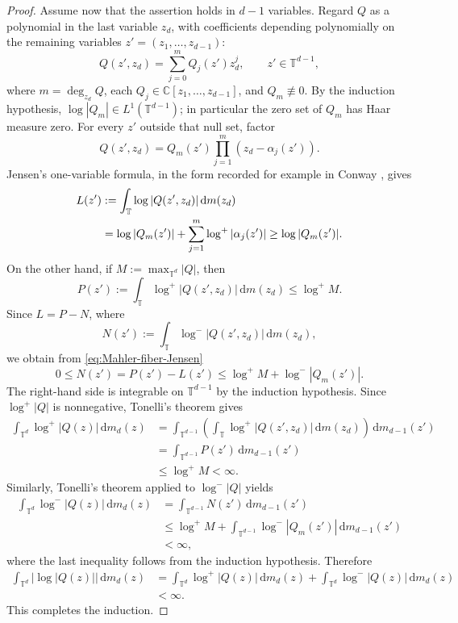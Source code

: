 \documentclass[11pt]{article}
\theoremstyle{definition}
\newcommand{\C}{\mathbb C}
\newcommand{\T}{\mathbb T}
\newcommand{\dd}{\,\mathrm d}
\newcommand{\1}{\mathbf 1}
\begin{document}
\begin{proof}
Assume now that the assertion holds in $d-1$ variables.  Regard $Q$
as a polynomial in the last variable $z_d$, with coefficients depending
polynomially on the remaining variables $z'=(z_1,\ldots,z_{d-1})$:
\[
Q(z',z_d)=\sum_{j=0}^m Q_j(z')z_d^j,
\qquad z'\in\T^{d-1},
\]
where $m=\deg_{z_d}Q$, each $Q_j\in\C[z_1,\ldots,z_{d-1}]$, and
$Q_m\not\equiv0$.  By the induction hypothesis, $\log|Q_m|\in L^1(\T^{d-1})$; in particular the zero set of $Q_m$ has Haar measure zero.  For every $z'$ outside that null set, factor
\[
Q(z',z_d)=Q_m(z')\prod_{j=1}^m(z_d-\alpha_j(z')).
\]
Jensen's one-variable formula, in the form recorded for example in Conway \cite[Chapter~XI, Section~1]{Conway1978}, gives
\begin{align}
L(z')
&:=\int_{\T}\log|Q(z',z_d)|\dd m(z_d)\notag\\
&=\log|Q_m(z')|+\sum_{j=1}^m\log^+|\alpha_j(z')|
\ge \log|Q_m(z')|.
\label{eq:Mahler-fiber-Jensen}
\end{align}
On the other hand, if $M:=\max_{\T^d}|Q|$, then
\[
P(z'):=\int_{\T}\log^+|Q(z',z_d)|\dd m(z_d)
\le \log^+M.
\]
Since $L=P-N$, where
\[
N(z'):=\int_{\T}\log^-|Q(z',z_d)|\dd m(z_d),
\]
we obtain from \eqref{eq:Mahler-fiber-Jensen}
\[
0\le N(z')
=P(z')-L(z')
\le \log^+M+\log^-|Q_m(z')|.
\]
The right-hand side is integrable on $\T^{d-1}$ by the induction
hypothesis.  Since $\log^+|Q|$ is nonnegative, Tonelli's theorem gives
\[
\begin{aligned}
\int_{\T^d}\log^+|Q(z)|\dd m_d(z)
&=
\int_{\T^{d-1}}
\left(
\int_{\T}\log^+|Q(z',z_d)|\dd m(z_d)
\right)
\dd m_{d-1}(z')\\
&=
\int_{\T^{d-1}}P(z')\dd m_{d-1}(z')\\
&\le \log^+M<\infty.
\end{aligned}
\]
Similarly, Tonelli's theorem applied to $\log^-|Q|$ yields
\[
\begin{aligned}
\int_{\T^d}\log^-|Q(z)|\dd m_d(z)
&=
\int_{\T^{d-1}}N(z')\dd m_{d-1}(z')\\
&\le
\log^+M+
\int_{\T^{d-1}}\log^-|Q_m(z')|
\dd m_{d-1}(z')\\
&<\infty,
\end{aligned}
\]
where the last inequality follows from the induction hypothesis.
Therefore
\[
\begin{aligned}
\int_{\T^d}|\log|Q(z)||\dd m_d(z)
&=
\int_{\T^d}\log^+|Q(z)|\dd m_d(z)
+
\int_{\T^d}\log^-|Q(z)|\dd m_d(z)\\
&<\infty.
\end{aligned}
\]
This completes the induction.
\end{proof}
\end{document}
